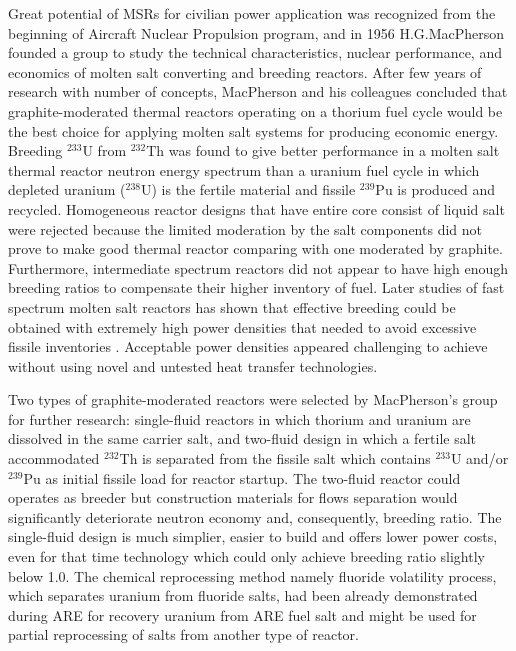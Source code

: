 Great potential of \glspl{MSR} for civilian power application was recognized from the beginning of Aircraft Nuclear Propulsion program, and in 1956 H.G.MacPherson founded a group to study the technical characteristics, nuclear performance, and economics of molten salt converting and breeding reactors. After few years of research with number of concepts, MacPherson and his colleagues concluded that graphite-moderated thermal reactors operating on a thorium fuel cycle would be the best choice for applying molten salt systems for producing economic energy. Breeding $^{233}$U from $^{232}$Th was found to give better performance in a molten salt thermal reactor neutron energy spectrum than a uranium fuel cycle in which depleted uranium ($^{238}$U) is the fertile material and fissile $^{239}$Pu is produced and recycled. Homogeneous reactor designs that have entire core consist of liquid salt were rejected because the limited moderation by the salt components did not prove to make good thermal reactor comparing with one moderated by graphite. Furthermore, intermediate spectrum reactors did not appear to have high enough breeding ratios to compensate their higher inventory of fuel. Later studies of fast spectrum molten salt reactors has shown that effective breeding could be obtained with extremely high power densities that needed to avoid excessive fissile inventories \cite{kasten_mosel_1964}. Acceptable  power densities appeared challenging to achieve without using novel and untested heat transfer technologies.

Two types of graphite-moderated reactors were selected by MacPherson's group for further research: single-fluid reactors in which thorium and uranium are dissolved in the same carrier salt, and two-fluid design in which a fertile salt accommodated $^{232}$Th is separated from the fissile salt which contains $^{233}$U and/or $^{239}$Pu as initial fissile load for reactor startup. The two-fluid reactor could operates as breeder but construction materials for flows separation would significantly deteriorate neutron economy and, consequently, breeding ratio. The single-fluid design is much simplier, easier to build and offers lower power costs, even for that time technology which could only achieve breeding ratio slightly below 1.0. The chemical reprocessing method namely fluoride volatility process, which separates uranium from fluoride salts, had been already demonstrated during \gls{ARE} for recovery uranium from \gls{ARE} fuel salt and might be used for partial reprocessing of salts from another type of reactor.

